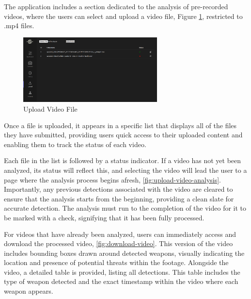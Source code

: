 The application includes a section dedicated to the analysis of pre-recorded videos, where the users can select and 
upload a video file, Figure \ref{fig:upload-video}, restricted to .mp4 files. 

\begin{figure}[h]
    \centering 
    \includegraphics[width=0.65\textwidth]{figs/upload-video-page.png} 
    \caption{Upload Video File}
    \label{fig:upload-video}
\end{figure}

Once a file is uploaded, it appears in a specific list that displays all of the files they have submitted, providing 
users quick access to their uploaded content and enabling them to track the status of each video.

Each file in the list is followed by a status indicator. If a video has not yet been analyzed, its status 
will reflect this, and selecting the video will lead the user to a page where the analysis process begins afresh, 
\ref{fig:upload-video-analysis}. 
Importantly, any previous detections associated with the video are cleared to ensure that the analysis starts from 
the beginning, providing a clean slate for accurate detection. The analysis must run to the completion of the video 
for it to be marked with a check, signifying that it has been fully processed.

For videos that have already been analyzed, users can immediately access and download the processed video, \ref{fig:download-video}. 
This version of the video includes bounding boxes drawn around detected weapons, visually indicating the location 
and presence of potential threats within the footage. Alongside the video, a detailed table is provided, listing 
all detections. This table includes the type of weapon detected and the exact timestamp within the video where each 
weapon appears.

